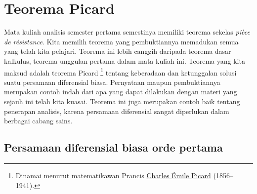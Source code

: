 
\sectionnewpage
\section{Teorema Picard}
\label{sec:picard}



Mata kuliah analisis semester pertama semestinya memiliki
teorema sekelas \emph{pi\`ece de r\'esistance}.
Kita memilih teorema yang pembuktiannya memadukan semua yang telah kita
pelajari.  Teorema ini lebih canggih daripada teorema dasar kalkulus,
teorema unggulan pertama dalam mata kuliah ini.  Teorema
yang kita maksud adalah teorema
Picard%
\footnote{Dinamai menurut matematikawan Prancis
\href{https://en.wikipedia.org/wiki/\%C3\%89mile_Picard}{Charles \'Emile Picard}
(1856--1941).}
tentang keberadaan dan ketunggalan solusi suatu persamaan diferensial biasa.
Pernyataan maupun pembuktiannya merupakan contoh indah dari apa yang dapat dilakukan
dengan materi yang sejauh ini telah kita kuasai.  Teorema ini juga merupakan contoh baik tentang penerapan analisis,
karena persamaan diferensial sangat diperlukan dalam berbagai cabang
sains.

\subsection{Persamaan diferensial biasa orde pertama}

